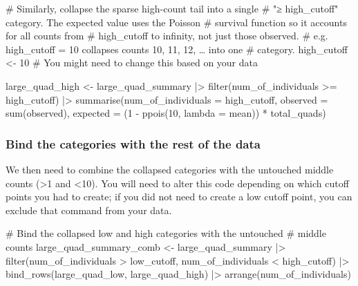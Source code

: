 \documentclass[
  letterpaper,
  DIV=11,
  numbers=noendperiod]{scrreprt}
\newenvironment{Shaded}{\begin{snugshade}}{\end{snugshade}}
\newcommand{\AttributeTok}[1]{\textcolor[rgb]{0.40,0.45,0.13}{#1}}
\newcommand{\CommentTok}[1]{\textcolor[rgb]{0.37,0.37,0.37}{#1}}
\newcommand{\DecValTok}[1]{\textcolor[rgb]{0.68,0.00,0.00}{#1}}
\newcommand{\FunctionTok}[1]{\textcolor[rgb]{0.28,0.35,0.67}{#1}}
\newcommand{\NormalTok}[1]{\textcolor[rgb]{0.00,0.23,0.31}{#1}}
\newcommand{\OtherTok}[1]{\textcolor[rgb]{0.00,0.23,0.31}{#1}}
\newcommand{\SpecialCharTok}[1]{\textcolor[rgb]{0.37,0.37,0.37}{#1}}
\begin{document}
\begin{Shaded}
\begin{Highlighting}[]
\CommentTok{\# Similarly, collapse the sparse high{-}count tail into a single}
\CommentTok{\# "≥ high\_cutoff" category. The expected value uses the Poisson}
\CommentTok{\# survival function so it accounts for all counts from}
\CommentTok{\# high\_cutoff to infinity, not just those observed.}
\CommentTok{\# e.g. high\_cutoff = 10 collapses counts 10, 11, 12, … into one}
\CommentTok{\# category.}
\NormalTok{high\_cutoff }\OtherTok{\textless{}{-}} \DecValTok{10} \CommentTok{\# You might need to change this based on your data}

\NormalTok{large\_quad\_high }\OtherTok{\textless{}{-}}\NormalTok{ large\_quad\_summary }\SpecialCharTok{|\textgreater{}}
  \FunctionTok{filter}\NormalTok{(num\_of\_individuals }\SpecialCharTok{\textgreater{}=}\NormalTok{ high\_cutoff) }\SpecialCharTok{|\textgreater{}}
  \FunctionTok{summarise}\NormalTok{(}\AttributeTok{num\_of\_individuals =}\NormalTok{ high\_cutoff,}
            \AttributeTok{observed =} \FunctionTok{sum}\NormalTok{(observed),}
            \AttributeTok{expected =}\NormalTok{ (}\DecValTok{1} \SpecialCharTok{{-}} \FunctionTok{ppois}\NormalTok{(}\DecValTok{10}\NormalTok{, }\AttributeTok{lambda =}\NormalTok{ mean)) }\SpecialCharTok{*}\NormalTok{ total\_quads)}
\end{Highlighting}
\end{Shaded}

\subsubsection{Bind the categories with the rest of the
data}\label{bind-the-categories-with-the-rest-of-the-data}

We then need to combine the collapsed categories with the untouched
middle counts (\textgreater1 and \textless10). You will need to alter
this code depending on which cutoff points you had to create; if you did
not need to create a low cutoff point, you can exclude that command from
your data.

\begin{Shaded}
\begin{Highlighting}[]
\CommentTok{\# Bind the collapsed low and high categories with the untouched}
\CommentTok{\# middle counts}
\NormalTok{large\_quad\_summary\_comb }\OtherTok{\textless{}{-}}\NormalTok{ large\_quad\_summary }\SpecialCharTok{|\textgreater{}}
  \FunctionTok{filter}\NormalTok{(num\_of\_individuals }\SpecialCharTok{\textgreater{}}\NormalTok{ low\_cutoff,}
\NormalTok{         num\_of\_individuals }\SpecialCharTok{\textless{}}\NormalTok{ high\_cutoff) }\SpecialCharTok{|\textgreater{}}
  \FunctionTok{bind\_rows}\NormalTok{(large\_quad\_low, large\_quad\_high) }\SpecialCharTok{|\textgreater{}}
  \FunctionTok{arrange}\NormalTok{(num\_of\_individuals)}
\end{Highlighting}
\end{Shaded}
\end{document}
